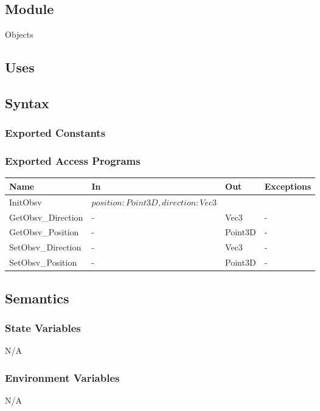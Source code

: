 \documentclass[12pt, titlepage]{article}
\begin{document}
\subsection{Module}
Objects

\subsection{Uses}

\subsection{Syntax}
\subsubsection{Exported Constants}
\subsubsection{Exported Access Programs}
\begin{center}
	\begin{tabular}{p{4cm} p{2cm} p{2cm} p{4cm}}
		\hline
		\textbf{Name} & \textbf{In} & \textbf{Out} & \textbf{Exceptions} \\
		\hline
		InitObsv & $position : Point3D, direction : Vec3$  & & \\
		GetObsv\_Direction & - & Vec3 & - \\
		GetObsv\_Position & - & Point3D & - \\
		SetObsv\_Direction & - & Vec3 & - \\
		SetObsv\_Position & - & Point3D & - \\
		\hline
	\end{tabular}
\end{center}

\subsection{Semantics}
\subsubsection{State Variables}
N/A

\subsubsection{Environment Variables}
N/A
\end{document}
